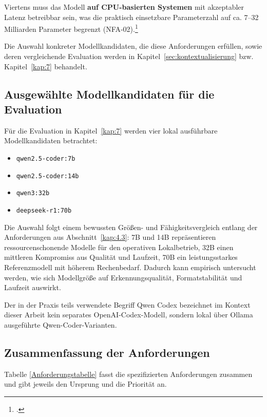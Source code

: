 Viertens muss das Modell \textbf{auf \ac{CPU}-basierten Systemen} mit akzeptabler Latenz betreibbar sein, was die praktisch einsetzbare Parameterzahl auf ca. 7--32 Milliarden Parameter begrenzt (\ac{NFA}-02).\footcite[Vgl.][S. 3]{hui2024qwen25coder}
 
Die Auswahl konkreter Modellkandidaten, die diese Anforderungen erfüllen, sowie deren vergleichende Evaluation werden in Kapitel~\ref{sec:kontextualisierung} bzw. Kapitel~\ref{kap:7} behandelt.

\subsection{Ausgewählte Modellkandidaten für die Evaluation}

Für die Evaluation in Kapitel~\ref{kap:7} werden vier lokal ausführbare Modellkandidaten betrachtet:

\begin{itemize}
	\item \texttt{qwen2.5-coder:7b}
	\item \texttt{qwen2.5-coder:14b}
	\item \texttt{qwen3:32b}
	\item \texttt{deepseek-r1:70b}
\end{itemize}

Die Auswahl folgt einem bewussten Größen- und Fähigkeitsvergleich entlang der Anforderungen aus Abschnitt~\ref{kap:4.3}: 7B und 14B repräsentieren ressourcenschonende Modelle für den operativen Lokalbetrieb, 32B einen mittleren Kompromiss aus Qualität und Laufzeit, 70B ein leistungsstarkes Referenzmodell mit höherem Rechenbedarf. Dadurch kann empirisch untersucht werden, wie sich Modellgröße auf Erkennungsqualität, Formatstabilität und Laufzeit auswirkt.

Der in der Praxis teils verwendete Begriff \glqq Qwen Codex\grqq{} bezeichnet im Kontext dieser Arbeit kein separates OpenAI-Codex-Modell, sondern lokal über Ollama ausgeführte Qwen-Coder-Varianten.
 
\subsection{Zusammenfassung der Anforderungen}
 
Tabelle \ref{Anforderungstabelle} fasst die spezifizierten Anforderungen zusammen und gibt jeweils den Ursprung und die Priorität an.
 
